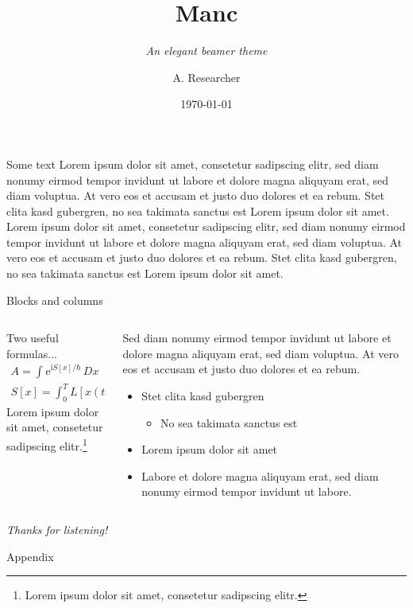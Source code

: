 \documentclass[compress,aspectratio=1610]{beamer}
\title{Manc}
\subtitle{\textit{An elegant beamer theme}}
\date{\today}
\author{A. Researcher}
\institute{\texttt{mymail@myuniversity.edu}}
\begin{document}
\maketitle

\begin{frame}{Some text}
	Lorem ipsum dolor sit amet, consetetur sadipscing elitr, sed diam nonumy eirmod tempor invidunt ut labore et dolore magna aliquyam erat, sed diam voluptua. At vero eos et accusam et justo duo dolores et ea rebum. Stet clita kasd gubergren, no sea takimata sanctus est Lorem ipsum dolor sit amet. Lorem  ipsum dolor sit amet, consetetur sadipscing elitr, sed diam nonumy eirmod tempor invidunt ut labore et dolore magna aliquyam erat, sed diam voluptua. At vero eos et accusam et justo duo dolores et ea rebum. Stet clita kasd gubergren, no sea takimata sanctus est Lorem ipsum dolor sit amet.
\end{frame}

\begin{frame}{Blocks and columns}
  \begin{columns}
    \begin{column}{0.5\textwidth}
      \begin{block}{Two useful formulas...}
        \begin{gather*}
          A = \int^{}\mathrm{e}^{\mathrm{i} S[x] / \hbar}\,Dx \\
          S[x] = \int^{T}_0 L[x(t)]\,\mathrm{d}t
        \end{gather*}
      Lorem ipsum dolor sit amet, consetetur sadipscing elitr.\footnote[frame]{Lorem ipsum dolor sit amet, consetetur sadipscing elitr.}
      \end{block}
    \end{column}
    \begin{column}{0.5\textwidth}
      Sed diam nonumy eirmod tempor invidunt ut labore et dolore magna aliquyam erat, sed diam voluptua. At vero eos et accusam et justo duo dolores et ea rebum.

      \begin{itemize}
        \item Stet clita kasd gubergren
          \begin{itemize}
            \item No sea takimata sanctus est
          \end{itemize}
        \item Lorem ipsum dolor sit amet
        \item Labore et dolore magna aliquyam erat, sed diam nonumy eirmod tempor invidunt ut labore.
      \end{itemize}
    \end{column}
  \end{columns}
\end{frame}

\begin{darkframe}[noframenumbering]
  \centering
  \textit{Thanks for listening!}
\end{darkframe}

\appendix
\begin{darkframe}
  \centering
   Appendix
\end{darkframe}
\end{document}
